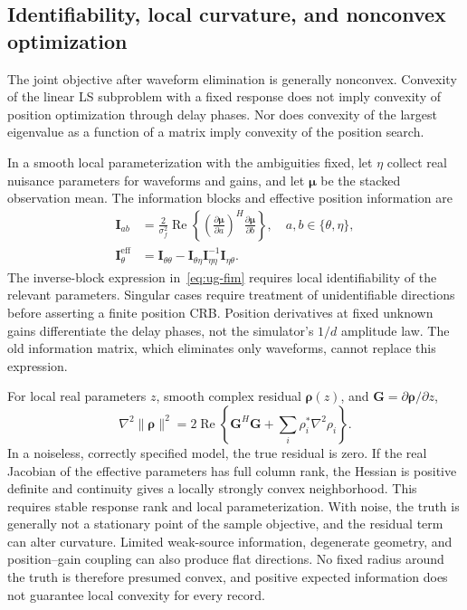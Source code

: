 \subsection{Identifiability, local curvature, and nonconvex optimization}\label{sec:ug-information}
The joint objective after waveform elimination is generally nonconvex. Convexity of the linear LS subproblem with a fixed response does not imply convexity of position optimization through delay phases. Nor does convexity of the largest eigenvalue as a function of a matrix imply convexity of the position search.

In a smooth local parameterization with the ambiguities fixed, let $\eta$ collect real nuisance parameters for waveforms and gains, and let $\boldsymbol{\mu}$ be the stacked observation mean. The information blocks and effective position information are
\begin{equation}\label{eq:ug-fim}
\begin{aligned}
\mathbf I_{ab}&=\frac{2}{\sigma_f^2}\operatorname{Re}
\left\{\left(\frac{\partial\boldsymbol{\mu}}{\partial a}\right)^H
\frac{\partial\boldsymbol{\mu}}{\partial b}\right\},\quad a,b\in\{\theta,\eta\},\\
\mathbf I_{\theta}^{\mathrm{eff}}&=\mathbf I_{\theta\theta}
-\mathbf I_{\theta\eta}\mathbf I_{\eta\eta}^{-1}\mathbf I_{\eta\theta}.
\end{aligned}
\end{equation}
The inverse-block expression in~\eqref{eq:ug-fim} requires local identifiability of the relevant parameters. Singular cases require treatment of unidentifiable directions before asserting a finite position CRB\cite{ref10}. Position derivatives at fixed unknown gains differentiate the delay phases, not the simulator's $1/d$ amplitude law. The old information matrix, which eliminates only waveforms, cannot replace this expression.

For local real parameters $z$, smooth complex residual $\boldsymbol{\rho}(z)$, and $\mathbf G=\partial\boldsymbol{\rho}/\partial z$,
\begin{equation}\label{eq:ug-hessian}
\nabla^2\|\boldsymbol{\rho}\|^2
=2\operatorname{Re}\!\left\{\mathbf G^H\mathbf G
+\sum_i\rho_i^*\nabla^2\rho_i\right\}.
\end{equation}
In a noiseless, correctly specified model, the true residual is zero. If the real Jacobian of the effective parameters has full column rank, the Hessian is positive definite and continuity gives a locally strongly convex neighborhood. This requires stable response rank and local parameterization. With noise, the truth is generally not a stationary point of the sample objective, and the residual term can alter curvature. Limited weak-source information, degenerate geometry, and position--gain coupling can also produce flat directions. No fixed radius around the truth is therefore presumed convex, and positive expected information does not guarantee local convexity for every record.

